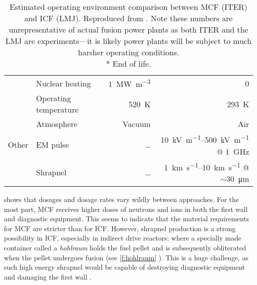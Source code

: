 \begin{table}
{\begin{tabular}{llrr}
                                       & Nuclear heating         & \SI{1}{\mega\watt.m^{-3}}    & 0                                                                                       \\
                                       & Operating temperature   & \SI{520}{\kelvin}            & \SI{293}{\kelvin}                                                                       \\
                                       & Atmosphere              & Vacuum                       & Air                                                                                     \\
      \midrule
      Other                            & EM pulse                & \ldots                       & \SIrange[range-units = single]{10}{500}{\kilo\volt.m^{-1}} @ \SI{1}{\giga\hertz}        \\
                                       & Shrapnel                & \ldots                       & \SIrange[range-units = single]{1}{10}{\kilo\metre.s^{-1}} @ $\sim$\SI{30}{\micro\metre} \\
      \bottomrule
    \end{tabular}
  }
  \caption[Estimated operating conditions of MCF and ICF fusion reactors.]{Estimated operating environment comparison between MCF (ITER) and ICF (LMJ). Reproduced from \cite{openv}. Note these numbers are unrepresentative of actual fusion power plants as both ITER and the LMJ are experiments---it is likely power plants will be subject to much harsher operating conditions. \\* End of life.}
  \label{tab:rad}
\end{table}

 shows that dosages and dosage rates vary wildly between approaches. For the most part, MCF receives higher doses of neutrons and ions in both the first wall and diagnostic equipment. This seems to indicate that the material requirements for MCF are stricter than for ICF. However, shrapnel production is a strong possibility in ICF, especially in indirect drive reactors; where a specially made container called a \emph{hohlraum} holds the fuel pellet and is subsequently obliterated when the pellet undergoes fusion (see \cref{f:hohlraum} \cite{hohlraum}). This is a huge challenge, as such high energy shrapnel would be capable of destroying diagnostic equipment and damaging the first wall \cite{icfpwr1,icfpwr2,icfpwr3}.


